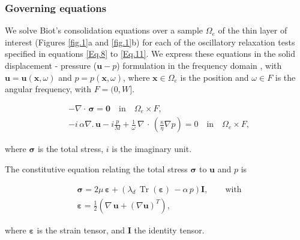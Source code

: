 \documentclass[draft]{agujournal2019}
\DeclareMathOperator{\tr}{Tr}
\begin{document}
\subsubsection{Governing equations}
We solve Biot's consolidation equations \cite{Biot1941, Biot1962} over a sample  $\Omega_e$ of the thin layer of interest (Figures \ref{fig.1}a and \ref{fig.1}b) for each of the oscillatory relaxation tests specified in equations
\eqref{Eq.8} to \eqref{Eq.11}. We express these equations in the solid displacement - pressure ($\bm{u}-p$) formulation in the frequency domain \cite{Quintal2011,Favino2020},  with $\bm{u} = \bm{u}(\bm{x}, \omega)$ and $p = p(\bm{x},\omega)$, where $\bm{x} \in \Omega_e$ is the position and $\omega \in F$ is the angular frequency, with $F =(0,W]$. 
\begin{linenomath*}
\begin{equation}\label{Eq.6}
\begin{split}
& - \nabla \cdot \, \bm{\sigma} = \bm{0}  \quad  \textrm{in} \quad \Omega_e \times F,  \\
& - i \, \alpha \nabla . \, \bm{u} -i \frac{p}{M} + \frac{1}{\omega} \,\nabla \, \cdot \, \left( \frac{\kappa}{\eta} \nabla p\right)  =0 \quad  \textrm{in} \quad \Omega_e \times F,
\end{split}
\end{equation}
\end{linenomath*}
where $\bm{\sigma}$ is the total stress, $i$ is the imaginary unit.

The constitutive equation relating the total stress $\bm{\sigma}$ to $\bm{u}$ and $p$ is
\begin{linenomath*}
\begin{equation}\label{Eq.7}
\begin{split}
& \bm{\sigma} =  2\mu \, \bm{\varepsilon} +  \left( \lambda_d \,  \tr( \bm{\varepsilon})\, - \alpha \,p \right) \bm{I}, \qquad \text{with}\\
& \bm{\varepsilon} = \frac{1}{2} \left( \nabla \,\bm{u} + ({\nabla  \bm{u}})^T  \right),
 \end{split}
\end{equation}
\end{linenomath*}
where $\bm{\varepsilon}$ is the strain tensor,
and $\bm{I}$ the identity tensor. 

 
\end{document}
